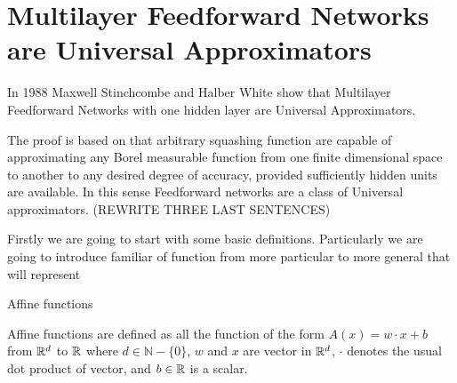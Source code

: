  


    
\section{Multilayer Feedforward Networks are Universal Approximators}

In 1988 Maxwell Stinchcombe and Halber White show that Multilayer
Feedforward Networks with one hidden layer are Universal Approximators.  

The proof is based on that arbitrary squashing function are capable of approximating
any Borel measurable function from one finite dimensional space to another to any desired 
degree of accuracy, provided sufficiently hidden units are available. In this sense 
Feedforward networks are a class of Universal approximators. 
(REWRITE THREE LAST SENTENCES)

Firstly we are going to start with some basic definitions. 
Particularly we are going to introduce familiar of function from more particular to more general 
that will represent 

\begin{definition}Affine functions  

    Affine functions are defined as all the 
    function of the form $A(x) = w \cdot x + b$ 
    from $\mathbb{R} ^d$ to $\mathbb{R}$
    where $d \in \mathbb{N} - \{ 0 \}$, $w$ and $x$  are vector in $\mathbb{R}^d$,  
    $\cdot$ 
    denotes the usual dot product of vector, and $b \in \mathbb{R}$ is a scalar.  
    
\end{definition}

